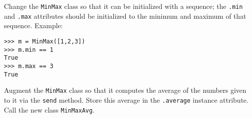 \documentclass[english,serif,mathserif,xcolor=pdftex,dvipsnames,table]{beamer}
\begin{document}
\begin{frame}[fragile]
  \begin{exercise}
    Change the \texttt{MinMax} class so that it can be initialized
    with a sequence; the \texttt{.min} and \texttt{.max} attributes
    should be initialized to the minimum and maximum of that sequence.
    Example:
\begin{lstlisting}
>>> m = MinMax([1,2,3])
>>> m.min == 1
True
>>> m.max == 3
True
\end{lstlisting}
  \end{exercise}

  \begin{exercise}
    Augment the \texttt{MinMax} class so that it computes the
    average of the numbers given to it via the \texttt{send} method.
    Store this average in the \texttt{.average} instance attribute.
    Call the new class \texttt{MinMaxAvg}.
  \end{exercise}
\end{frame}








\end{document}
